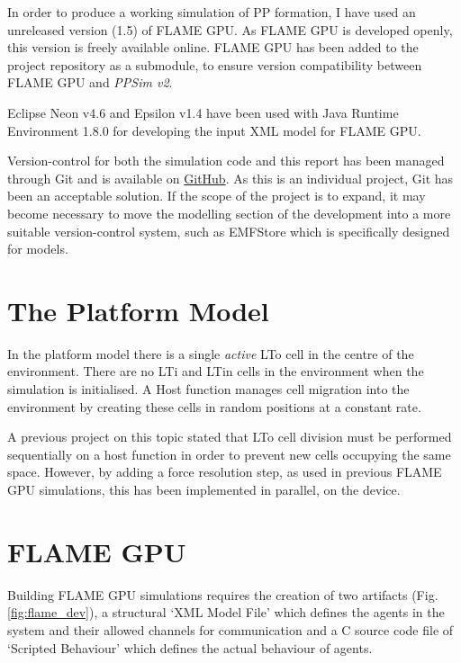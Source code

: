\documentclass{UoYCSproject}
\begin{document}
In order to produce a working simulation of \gls{PP} formation, I have used an unreleased version (1.5) of \gls{FLAME GPU}.
As \gls{FLAME GPU} is developed openly, this version is freely available online\cite{flame_github}.
\gls{FLAME GPU} has been added to the project repository as a submodule, to ensure version compatibility between \gls{FLAME GPU} and \textit{PPSim v2}.

Eclipse Neon v4.6 and Epsilon v1.4 have been used with Java Runtime Environment 1.8.0 for developing the input XML model for \gls{FLAME GPU}.

Version-control for both the simulation code and this report has been managed through Git and is available on \href{https://github.com/oliver-binns/PRIY.git}{GitHub}. As this is an individual project, Git has been an acceptable solution. If the scope of the project is to expand, it may become necessary to move the modelling section of the development into a more suitable version-control system, such as EMFStore\cite{emf_store} which is specifically designed for models.

\section{The Platform Model}
In the platform model there is a single \textit{active} \gls{LTo} cell in the centre of the environment.
There are no LTi and LTin cells in the environment when the simulation is initialised.
A \gls{Host} function manages cell migration into the environment by creating these cells in random positions at a constant rate.

A previous project on this topic stated that LTo cell division must be performed sequentially on a host function in order to prevent new cells occupying the same space\cite{phil_diss}.
However, by adding a force resolution step, as used in previous \gls{FLAME GPU} simulations\cite{flame_keratinocyte}, this has been implemented in parallel, on the device.

\section{\gls{FLAME GPU}}
Building \gls{FLAME GPU} simulations requires the creation of two artifacts (Fig. \ref{fig:flame_dev}), a structural `XML Model File' which defines the agents in the system and their allowed channels for communication and a C source code file of `Scripted Behaviour' which defines the actual behaviour of agents.
\end{document}
